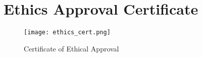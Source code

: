 \chapter{Ethics Approval Certificate}

\begin{figure*}[htbp]
    \centering
    \texttt{[image: ethics\_cert.png]}
    \caption{Certificate of Ethical Approval}
\end{figure*}